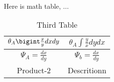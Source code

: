 \documentclass{article}
\begin{document}
Here is math table, ...
\begin{table}[p]
	\caption{Third Table}
	\centering
	\renewcommand{\arraystretch}{2}
	\begin{tabular}{  c  c  }
		\toprule
		$\theta_A\bigint\frac{x}{y}dxdy$ & $\theta_A\int\frac{y}{x}dydx$ \\  
		\midrule
		$\Psi_A=\frac{dx}{dy}$ & $\Psi_b=\frac{dx}{dy}$  \\
		\midrule
		Product-2 & Descritionn \\
		\bottomrule
	\end{tabular} \\
\end{table}



	
\end{document}
